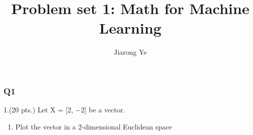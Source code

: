 \documentclass[11pt]{article}
\title{Problem set 1: Math for Machine
Learning}
\author{Jiarong Ye}
\providecommand{\tightlist}{%
      \setlength{\itemsep}{0pt}\setlength{\parskip}{0pt}}
\begin{document}
    
    
    \maketitle
    
    


    \subsubsection*{Q1}\label{q1}

    1.(20 pts.) Let X = {[}2, −2{]} be a vector.

\begin{enumerate}
\def\labelenumi{(\alph{enumi})}
\tightlist
\item
  Plot the vector in a 2-dimensional Euclidean space
\end{enumerate}
\end{document}

